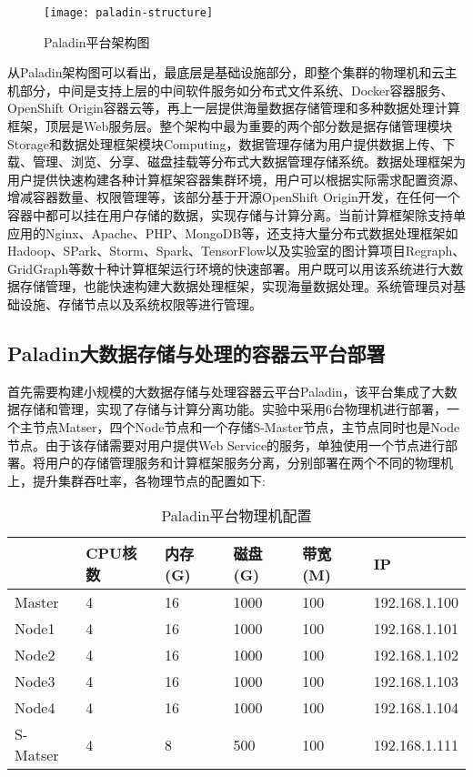 \begin{figure}[H] %
	\centering
	\texttt{[image: paladin-structure]}
	\caption{Paladin平台架构图}
\end{figure}

从Paladin架构图可以看出，最底层是基础设施部分，即整个集群的物理机和云主机部分，中间是支持上层的中间软件服务如分布式文件系统、Docker容器服务、OpenShift Origin容器云等，再上一层提供海量数据存储管理和多种数据处理计算框架，顶层是Web服务层。整个架构中最为重要的两个部分数是据存储管理模块Storage和数据处理框架模块Computing，数据管理存储为用户提供数据上传、下载、管理、浏览、分享、磁盘挂载等分布式大数据管理存储系统。数据处理框架为用户提供快速构建各种计算框架容器集群环境，用户可以根据实际需求配置资源、增减容器数量、权限管理等，该部分基于开源OpenShift Origin开发，在任何一个容器中都可以挂在用户存储的数据，实现存储与计算分离。当前计算框架除支持单应用的Nginx、Apache、PHP、MongoDB等，还支持大量分布式数据处理框架如Hadoop、SPark、Storm、Spark、TensorFlow以及实验室的图计算项目Regraph、GridGraph等数十种计算框架运行环境的快速部署。用户既可以用该系统进行大数据存储管理，也能快速构建大数据处理框架，实现海量数据处理。系统管理员对基础设施、存储节点以及系统权限等进行管理。

\subsection{Paladin大数据存储与处理的容器云平台部署}
首先需要构建小规模的大数据存储与处理容器云平台Paladin，该平台集成了大数据存储和管理，实现了存储与计算分离功能。实验中采用6台物理机进行部署，一个主节点Matser，四个Node节点和一个存储S-Master节点，主节点同时也是Node节点。由于该存储需要对用户提供Web Service的服务，单独使用一个节点进行部署。将用户的存储管理服务和计算框架服务分离，分别部署在两个不同的物理机上，提升集群吞吐率，各物理节点的配置如下:
\begin{table}[H]
	\centering\dawu[1.3]
	\caption{Paladin平台物理机配置}
	\begin{tabular}{|p{1.8cm}<{\centering}|p{1.5cm}<{\centering}|p{1.5cm}<{\centering}|p{1.5cm}<{\centering}|p{1.5cm}<{\centering}|p{3cm}<{\centering}|} \hline
		\diagbox[innerwidth=1.8cm]{节点}{资源} & CPU核数 & 内存(G) & 磁盘(G) & 带宽(M) & IP \\ \hline
		Master & 4 & 16 & 1000 & 100 & 192.168.1.100  \\ \hline
		Node1 & 4 & 16 & 1000 & 100  & 192.168.1.101 \\ \hline
		Node2 & 4 & 16 & 1000 & 100  & 192.168.1.102 \\ \hline
		Node3 & 4 & 16 & 1000 & 100  & 192.168.1.103 \\ \hline
		Node4 & 4 & 16 & 1000 & 100  & 192.168.1.104 \\ \hline
		S-Matser & 4 & 8 & 500 & 100  & 192.168.1.111 \\ \hline
	\end{tabular}
\end{table}

